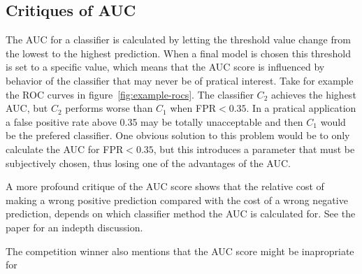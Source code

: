 \subsection{Critiques of AUC}\label{sec:auc-critique}
The AUC for a classifier is calculated by letting the threshold value change from the lowest to the highest prediction. When a final model is chosen this threshold is set to a specific value, which means that the AUC score is influenced by behavior of the classifier that may never be of pratical interest. Take for example the ROC curves in figure~\ref{fig:example-rocs}. The classifier $C_2$ achieves the highest AUC, but $C_2$ performs worse than $C_1$ when FPR$<0.35$. In a pratical application a false positive rate above 0.35 may be totally unacceptable and then $C_1$ would be the prefered classifier. One obvious solution to this problem would be to only calculate the AUC for FPR$<0.35$, but this introduces a parameter that must be subjectively chosen, thus losing one of the advantages of the AUC. \par
A more profound critique of the AUC score shows that the relative cost of making a wrong positive prediction compared with the cost of a wrong negative prediction, depends on which classifier method the AUC is calculated for. See the paper \citet{hand09} for an indepth discussion. \par
The competition winner also mentions that the AUC score might be inapropriate for \TFC\ \citep[p.5]{inference_winning_approach}




